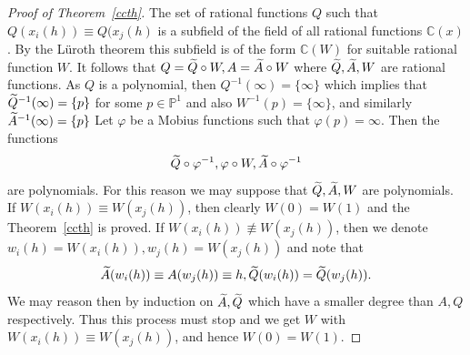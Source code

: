 \documentclass[11pt]{article}
\theoremstyle{definition}
\numberwithin{equation}{section}
\numberwithin{figure}{section}
\numberwithin{table}{section}
\newcommand{\Cbb}{\mathbb C}
\newcommand{\Pbb}{\mathbb P}
\let\oldtilde\tilde
\renewcommand*{\tilde}[1]{\mathchoice{\widetilde{#1}}{\widetilde{#1}}{\oldtilde{#1}}{\oldtilde{#1}}}
\begin{document}
\begin{proof}[Proof of Theorem~\ref{ccth}]
The set of rational functions $Q$ such that $ Q(x_i(h)) \equiv Q(x_j(h)$ is a subfield of the field of all rational functions $\Cbb(x)$. By the Lüroth theorem this subfield is of the form $\Cbb(W)$ for suitable rational function $W$. It follows that $Q= \tilde Q \circ W, A = \tilde A \circ W$ where $\tilde Q, \tilde A, W$ are rational functions. As $Q$ is a polynomial, then $Q^{-1}(\infty)= \{ \infty \}$ which implies that $\tilde Q^{-1}(\infty) = \{p\}$ for some $p\in \Pbb^1$ and also $W^{-1}(p) = \{\infty\}$, and similarly $\tilde A^{-1}(\infty) = \{p\}$ Let $\varphi$ be a Mobius functions such that $\varphi(p)=\infty$. Then the functions
\[
\tilde Q \circ \varphi^{-1}, \varphi \circ W, \tilde A \circ \varphi^{-1}
\]
are polynomials. For this reason we may suppose that $\tilde Q, \tilde A, W$ are polynomials. If $W(x_i(h))\equiv W(x_j(h)) $, then clearly $W(0) = W(1)$ and the Theorem~\ref{ccth} is proved. If $W(x_i(h))\not\equiv W(x_j(h)) $, then we denote $ w_i(h) = W(x_i(h)), w_j(h) = W(x_j(h)) $ and note that
\[
\tilde A(w_i(h)) \equiv A(w_j(h)) \equiv h, \tilde Q(w_i(h)) = \tilde Q(w_j(h)).
\]
We may reason then by induction on $\tilde A, \tilde Q$ which have a smaller degree than $A, Q$ respectively. Thus this process must stop and we get $W$ with $W(x_i(h))\equiv W(x_j(h)) $, and hence $W(0)=W(1)$.
\end{proof}
\end{document}
